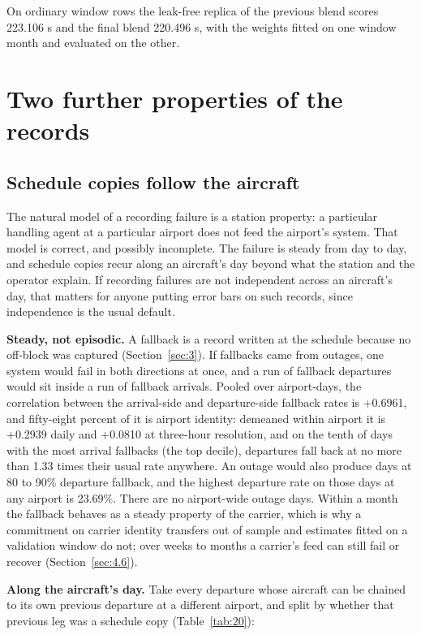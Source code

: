 \documentclass[
  manuscript=article,
  layout=preprint,
  year=2026,
  volume=x,
]{extra/joas}
\begin{document}
On ordinary window rows the leak-free replica of the previous blend scores 223.106 s and the final blend 220.496 s, with the weights fitted on one window month and evaluated on the other.
\section{Two further properties of the records}\label{sec:C}

\subsection{Schedule copies follow the aircraft}\label{sec:C.1}

The natural model of a recording failure is a station property: a particular handling agent at a particular airport does not feed the airport's system. That model is correct, and possibly incomplete. The failure is steady from day to day, and schedule copies recur along an aircraft's day beyond what the station and the operator explain. If recording failures are not independent across an aircraft's day, that matters for anyone putting error bars on such records, since independence is the usual default.

\textbf{Steady, not episodic.} A fallback is a record written at the schedule because no off-block was captured (Section~\ref{sec:3}). If fallbacks came from outages, one system would fail in both directions at once, and a run of fallback departures would sit inside a run of fallback arrivals. Pooled over airport-days, the correlation between the arrival-side and departure-side fallback rates is +0.6961, and fifty-eight percent of it is airport identity: demeaned within airport it is +0.2939 daily and +0.0810 at three-hour resolution, and on the tenth of days with the most arrival fallbacks (the top decile), departures fall back at no more than 1.33 times their usual rate anywhere. An outage would also produce days at 80 to 90\% departure fallback, and the highest departure rate on those days at any airport is 23.69\%. There are no airport-wide outage days. Within a month the fallback behaves as a steady property of the carrier, which is why a commitment on carrier identity transfers out of sample and estimates fitted on a validation window do not; over weeks to months a carrier's feed can still fail or recover (Section~\ref{sec:4.6}).

\textbf{Along the aircraft's day.} Take every departure whose aircraft can be chained to its own previous departure at a different airport, and split by whether that previous leg was a schedule copy (Table~\ref{tab:20}):
\end{document}
